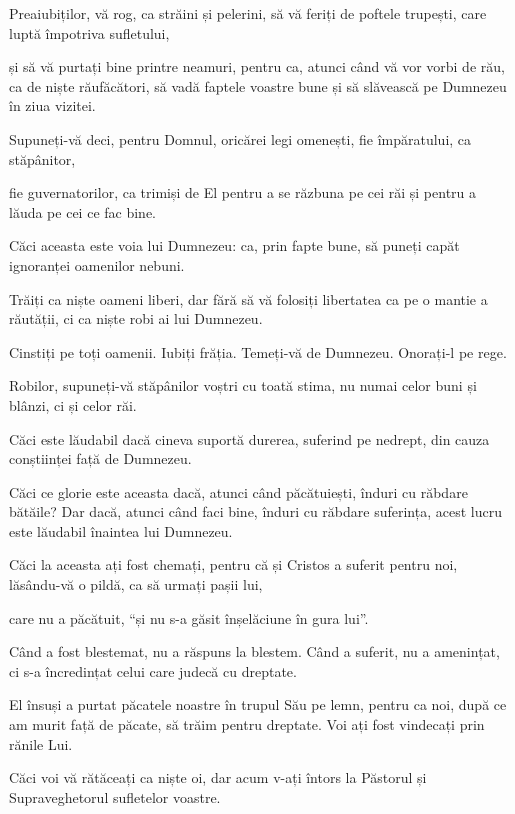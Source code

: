 {\par }{\PP {}Preaiubiților, vă rog, ca străini și pelerini, să vă feriți de poftele trupești, care luptă împotriva sufletului,

și să vă purtați bine printre neamuri, pentru ca, atunci când vă vor vorbi de rău, ca de niște răufăcători, să vadă faptele voastre bune și să slăvească pe Dumnezeu în ziua vizitei.


\par }{\PP {}Supuneți-vă deci, pentru Domnul, oricărei legi omenești, fie împăratului, ca stăpânitor,

fie guvernatorilor, ca trimiși de El pentru a se răzbuna pe cei răi și pentru a lăuda pe cei ce fac bine.

Căci aceasta este voia lui Dumnezeu: ca, prin fapte bune, să puneți capăt ignoranței oamenilor nebuni.

Trăiți ca niște oameni liberi, dar fără să vă folosiți libertatea ca pe o mantie a răutății, ci ca niște robi ai lui Dumnezeu.


\par }{\PP {}Cinstiți pe toți oamenii. Iubiți frăția. Temeți-vă de Dumnezeu. Onorați-l pe rege.


\par }{\PP {}Robilor, supuneți-vă stăpânilor voștri cu toată stima, nu numai celor buni și blânzi, ci și celor răi.

Căci este lăudabil dacă cineva suportă durerea, suferind pe nedrept, din cauza conștiinței față de Dumnezeu.

Căci ce glorie este aceasta dacă, atunci când păcătuiești, înduri cu răbdare bătăile? Dar dacă, atunci când faci bine, înduri cu răbdare suferința, acest lucru este lăudabil înaintea lui Dumnezeu.

Căci la aceasta ați fost chemați, pentru că și Cristos a suferit pentru noi, lăsându-vă o pildă, ca să urmați pașii lui,

care nu a păcătuit, “și nu s-a găsit înșelăciune în gura lui”.

Când a fost blestemat, nu a răspuns la blestem. Când a suferit, nu a amenințat, ci s-a încredințat celui care judecă cu dreptate.

El însuși a purtat păcatele noastre în trupul Său pe lemn, pentru ca noi, după ce am murit față de păcate, să trăim pentru dreptate. Voi ați fost vindecați prin rănile Lui.

Căci voi vă rătăceați ca niște oi, dar acum v-ați întors la Păstorul și Supraveghetorul sufletelor voastre.



}
